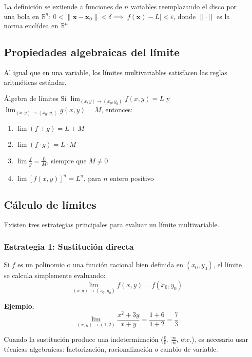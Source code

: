 La definición se extiende a funciones de $n$ variables reemplazando el disco por una bola en $\mathbb{R}^n$: $0 < \|\mathbf{x} - \mathbf{x}_0\| < \delta \implies |f(\mathbf{x}) - L| < \varepsilon$, donde $\|\cdot\|$ es la norma euclídea en $\mathbb{R}^n$.


\subsection{Propiedades algebraicas del límite}

Al igual que en una variable, los límites multivariables satisfacen las reglas aritméticas estándar.

\begin{mytheorem}{Álgebra de límites}
Si $\displaystyle\lim_{(x,y)\to(x_0,y_0)} f(x,y) = L$ y $\displaystyle\lim_{(x,y)\to(x_0,y_0)} g(x,y) = M$, entonces:
\begin{enumerate}
    \item $\displaystyle\lim (f \pm g) = L \pm M$
    \item $\displaystyle\lim (f \cdot g) = L \cdot M$
    \item $\displaystyle\lim \frac{f}{g} = \frac{L}{M}$, \quad siempre que $M \neq 0$
    \item $\displaystyle\lim [f(x,y)]^n = L^n$, \quad para $n$ entero positivo
\end{enumerate}
\end{mytheorem}

\subsection{Cálculo de límites}

Existen tres estrategias principales para evaluar un límite multivariable.

\subsubsection{Estrategia 1: Sustitución directa}

Si $f$ es un polinomio o una función racional bien definida en $(x_0, y_0)$, el límite se calcula simplemente evaluando:
\[ \lim_{(x,y) \to (x_0,y_0)} f(x,y) = f(x_0, y_0) \]

\textbf{Ejemplo.}
\[ \lim_{(x,y) \to (1,2)} \frac{x^2 + 3y}{x + y} = \frac{1 + 6}{1 + 2} = \frac{7}{3} \]

Cuando la sustitución produce una indeterminación ($\frac{0}{0}$, $\frac{\infty}{\infty}$, etc.), es necesario usar técnicas algebraicas: factorización, racionalización o cambio de variable.

